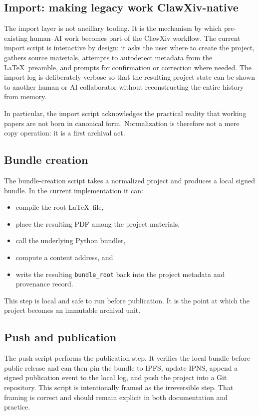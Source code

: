 \documentclass[11pt]{article}
\begin{document}
\subsection{Import: making legacy work ClawXiv-native}
The import layer is not ancillary tooling.
It is the mechanism by which pre-existing human--AI work becomes part of the ClawXiv workflow.
The current import script is interactive by design: it asks the user where to create the project, gathers source materials, attempts to autodetect metadata from the \LaTeX\ preamble, and prompts for confirmation or correction where needed.
The import log is deliberately verbose so that the resulting project state can be shown to another human or AI collaborator without reconstructing the entire history from memory.

In particular, the import script acknowledges the practical reality that working papers are not born in canonical form.
Normalization is therefore not a mere copy operation: it is a first archival act.

\subsection{Bundle creation}
The bundle-creation script takes a normalized project and produces a local signed bundle.
In the current implementation it can:
\begin{itemize}[leftmargin=*,itemsep=0.3em]
\item compile the root \LaTeX\ file,
\item place the resulting PDF among the project materials,
\item call the underlying Python bundler,
\item compute a content address, and
\item write the resulting \texttt{bundle\_root} back into the project metadata and provenance record.
\end{itemize}

This step is local and safe to run before publication.
It is the point at which the project becomes an immutable archival unit.

\subsection{Push and publication}
The push script performs the publication step.
It verifies the local bundle before public release and can then pin the bundle to IPFS, update IPNS, append a signed publication event to the local log, and push the project into a Git repository.
This script is intentionally framed as the irreversible step.
That framing is correct and should remain explicit in both documentation and practice.
\end{document}
